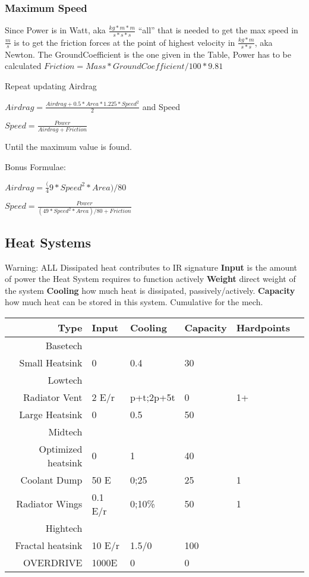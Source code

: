 \subsubsection{Maximum Speed}
Since Power is in Watt, aka
\(\frac{kg*m*m}{s*s*s}\)
``all'' that is needed to get the max speed in
\(\frac{m}{s}\) is to get
the friction forces at the point of highest velocity in \(\frac{kg*m}{s*s}\), aka Newton.
The GroundCoefficient is the one given in the Table, Power has to be calculated
\(Friction = Mass* GroundCoefficient/100 * 9.81\)\par
Repeat updating Airdrag\par
\(Airdrag = \frac{Airdrag + 0.5*Area*1.225 * Speed^2}{2}\)
and Speed\par
\(Speed = \frac{Power}{Airdrag + Friction}\)\par
Until the maximum value is found.\par
Bonus Formulae:\par
\(Airdrag = \frac(49*Speed^2*Area)/80 \) \par
\(Speed = \frac{Power}{(49*Speed^2*Area)/80 + Friction}\)


\subsection{Heat Systems}\label{subsec:heat-systems}
Warning: ALL Dissipated heat contributes to IR signature
\textbf{Input} is the amount of power the Heat System requires to function actively
\textbf{Weight} direct weight of the system
\textbf{Cooling} how much heat is dissipated, passively/actively.
\textbf{Capacity} how much heat can be stored in this system.
Cumulative for the mech.

\begin{tabular}{r|lllll}
    Type & Input & Cooling & Capacity & Hardpoints\\
    \hline Basetech\\
    Small Heatsink & 0 & 0.4 & 30 & \\
    \hline Lowtech\\
    Radiator Vent & 2 E/r & p+t;2p+5t & 0 & 1+\\
    Large Heatsink & 0 & 0.5 & 50 & \\
    \hline Midtech\\
    Optimized heatsink  & 0 & 1 & 40 & \\
    Coolant Dump  & 50 E & 0;25 & 25 & 1 \\
    Radiator Wings & 0.1 E/r & 0;10\% & 50 & 1\\
    \hline Hightech\\
    Fractal heatsink & 10 E/r & 1.5/0 & 100 & \\
    OVERDRIVE & 1000E & 0 &  0 & \\
\end{tabular}

